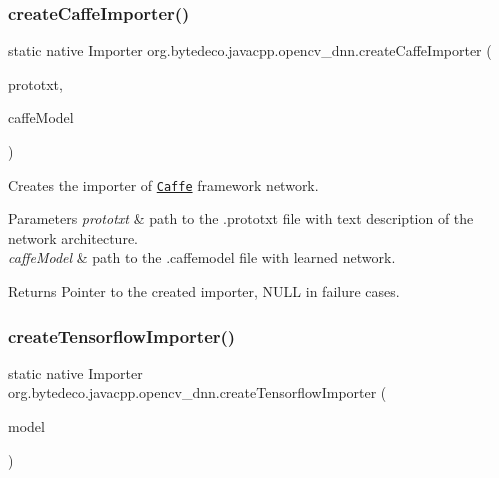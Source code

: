 \subsubsection{\texorpdfstring{create\+Caffe\+Importer()}{createCaffeImporter()}}
{\footnotesize\ttfamily static native Importer org.\+bytedeco.\+javacpp.\+opencv\+\_\+dnn.\+create\+Caffe\+Importer (\begin{DoxyParamCaption}\item[{@Str Byte\+Pointer}]{prototxt,  }\item[{@Str Byte\+Pointer}]{caffe\+Model }\end{DoxyParamCaption})\hspace{0.3cm}{\ttfamily [static]}}



Creates the importer of \href{http://caffe.berkeleyvision.org}{\tt Caffe} framework network. 


\begin{DoxyParams}{Parameters}
{\em prototxt} & path to the .prototxt file with text description of the network architecture. \\
\hline
{\em caffe\+Model} & path to the .caffemodel file with learned network. \\
\hline
\end{DoxyParams}
\begin{DoxyReturn}{Returns}
Pointer to the created importer, N\+U\+LL in failure cases. 
\end{DoxyReturn}
\mbox{\label{group__dnn_gafb21a0aa44b3feb934bcd5ad4fc708e3}} 
\subsubsection{\texorpdfstring{create\+Tensorflow\+Importer()}{createTensorflowImporter()}}
{\footnotesize\ttfamily static native Importer org.\+bytedeco.\+javacpp.\+opencv\+\_\+dnn.\+create\+Tensorflow\+Importer (\begin{DoxyParamCaption}\item[{@Str Byte\+Pointer}]{model }\end{DoxyParamCaption})\hspace{0.3cm}{\ttfamily [static]}}



